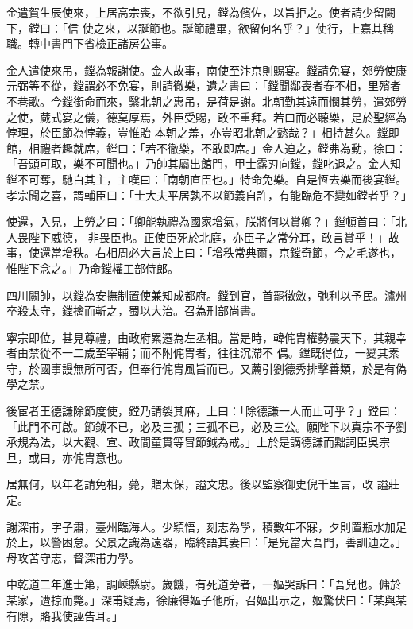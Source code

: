 \begin{pinyinscope}
 金遣賀生辰使來，上居高宗喪，不欲引見，鏜為儐佐，以旨拒之。使者請少留闕下，鏜曰：「信
 使之來，以誕節也。誕節禮畢，欲留何名乎？」使行，上嘉其稱職。轉中書門下省檢正諸房公事。



 金人遣使來吊，鏜為報謝使。金人故事，南使至汴京則賜宴。鏜請免宴，郊勞使康元弼等不從，鏜謂必不免宴，則請徹樂，遺之書曰：「鏜聞鄰喪者舂不相，里殯者不巷歌。今鏜銜命而來，繄北朝之惠吊，是荷是謝。北朝勤其遠而憫其勞，遣郊勞之使，蕆式宴之儀，德莫厚焉，外臣受賜，敢不重拜。若曰而必聽樂，是於聖經為悖理，於臣節為悖義，豈惟貽
 本朝之羞，亦豈昭北朝之懿哉？」相持甚久。鏜即館，相禮者趣就席，鏜曰：「若不徹樂，不敢即席。」金人迫之，鏜弗為動，徐曰：「吾頭可取，樂不可聞也。」乃帥其屬出館門，甲士露刃向鏜，鏜叱退之。金人知鏜不可奪，馳白其主，主嘆曰：「南朝直臣也。」特命免樂。自是恆去樂而後宴鏜。孝宗聞之喜，謂輔臣曰：「士大夫平居孰不以節義自許，有能臨危不變如鏜者乎？」



 使還，入見，上勞之曰：「卿能執禮為國家增氣，朕將何以賞卿？」鏜頓首曰：「北人畏陛下威德，
 非畏臣也。正使臣死於北庭，亦臣子之常分耳，敢言賞乎！」故事，使還當增秩。右相周必大言於上曰：「增秩常典爾，京鏜奇節，今之毛遂也，惟陛下念之。」乃命鏜權工部侍郎。



 四川闕帥，以鏜為安撫制置使兼知成都府。鏜到官，首罷徵斂，弛利以予民。瀘州卒殺太守，鏜擒而斬之，蜀以大治。召為刑部尚書。



 寧宗即位，甚見尊禮，由政府累遷為左丞相。當是時，韓侂胄權勢震天下，其親幸者由禁從不一二歲至宰輔；而不附侂胄者，往往沉滯不
 偶。鏜既得位，一變其素守，於國事謾無所可否，但奉行侂胄風旨而已。又薦引劉德秀排擊善類，於是有偽學之禁。



 後宦者王德謙除節度使，鏜乃請裂其麻，上曰：「除德謙一人而止可乎？」鏜曰：「此門不可啟。節鉞不已，必及三孤；三孤不已，必及三公。願陛下以真宗不予劉承規為法，以大觀、宣、政間童貫等冒節鉞為戒。」上於是謫德謙而黜詞臣吳宗旦，或曰，亦侂胄意也。



 居無何，以年老請免相，薨，贈太保，謚文忠。後以監察御史倪千里言，改
 謚莊定。



 謝深甫，字子肅，臺州臨海人。少穎悟，刻志為學，積數年不寐，夕則置瓶水加足於上，以警困怠。父景之識為遠器，臨終語其妻曰：「是兒當大吾門，善訓迪之。」母攻苦守志，督深甫力學。



 中乾道二年進士第，調嵊縣尉。歲饑，有死道旁者，一嫗哭訴曰：「吾兒也。傭於某家，遭掠而斃。」深甫疑焉，徐廉得嫗子他所，召嫗出示之，嫗驚伏曰：「某與某有隙，賂我使誣告耳。」




\end{pinyinscope}
